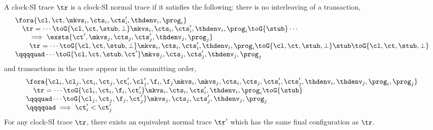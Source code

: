 \begin{theorem}
\label{thm:clock-si-normal-trace}
A clock-SI trace \( \tr \) is a clock-SI normal trace if it satisfies the following:
there is no interleaving of a transaction,
\begin{equation}
    \label{equ:clock-si-no-interleaving}
    \begin{array}{@{}l@{}}
        \fora{\cl,\ct, \mkvs_i, \cts_i, \cts'_i, \thdenv_i, \prog_i} \\
        \quad \tr = \cdots \toG{\cl,\ct,\stub, \perp} \mkvs_i, \cts_i, \cts'_i, \thdenv_i, \prog_i \toG{\stub} \cdots \\
        \qquad \implies \exsts{\ct', \mkvs_j, \cts_j, \cts'_j, \thdenv_j, \prog_j} \\
        \qquad \tr = \cdots \toG{\cl,\ct,\stub, \perp} \mkvs_i, \cts_i, \cts'_i, \thdenv_i, \prog_i \toG{\cl,\ct,\stub, \perp} \stub \toG{\cl,\ct,\stub, \perp} \\
        \qqqquad \cdots \toG{\cl,\ct,\stub,\ct'} \mkvs_j, \cts_j, \cts'_j, \thdenv_j, \prog_j
    \end{array}
\end{equation}
and transactions in the trace appear in the committing order, 
\begin{equation}
    \label{equ:clock-si-commit-order}
    \begin{array}{@{}l@{}}
        \fora{\cl_i,\cl_j,\ct_i, \ct_j, \ct'_i, \cl'_j, \f_i, \f_j \mkvs_i, \mkvs_j, \cts_i, \cts_j, \cts'_i, \cts'_j, \thdenv_i, \thdenv_j,  \prog_i, \prog_j} \\
        \quad \tr = \cdots \toG{\cl_i,\ct_i,\f_i,\ct'_i} \mkvs_i, \cts_i, \cts'_i, \thdenv_i, \prog_i \toG{\stub} \\
        \qqquad \cdots \toG{\cl_j,\ct_j,\f_j,\ct'_j} \mkvs_j, \cts_j, \cts'_j, \thdenv_j, \prog_j \\
        \qqqquad \implies \ct'_i < \ct'_j
    \end{array}
\end{equation}
For any clock-SI trace \( \tr \), there exists an equivalent normal trace \( \tr' \) which has the same final configuration as \( \tr \).
\end{theorem}
